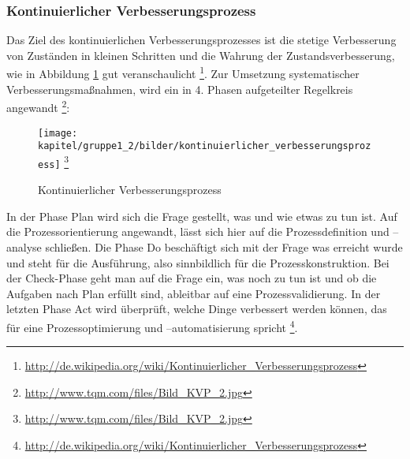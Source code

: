 \subsubsection{Kontinuierlicher Verbesserungsprozess}
\label{subsubsection_kontinuierlicher_verbesserungsprozess}
Das Ziel des kontinuierlichen Verbesserungsprozesses ist die stetige Verbesserung von Zuständen in kleinen Schritten und die Wahrung der  Zustandsverbesserung, wie in Abbildung \ref{fig_kontinuierliche_verbesserung} gut veranschaulicht \footnote{\url{http://de.wikipedia.org/wiki/Kontinuierlicher_Verbesserungsprozess}}. Zur Umsetzung systematischer Verbesserungsmaßnahmen, wird ein in 4. Phasen aufgeteilter Regelkreis angewandt \footnote{\url{http://www.tqm.com/files/Bild_KVP_2.jpg}}:
 
\begin{figure}[h!]
	\centering
	\texttt{[image: kapitel/gruppe1\_2/bilder/kontinuierlicher\_verbesserungsprozess]} \footnote{\url{http://www.tqm.com/files/Bild_KVP_2.jpg}}
	\caption{Kontinuierlicher Verbesserungsprozess}
	\label{fig_kontinuierliche_verbesserung}
\end{figure}


In der Phase Plan wird sich die Frage gestellt, was und wie etwas zu tun ist. Auf die Prozessorientierung angewandt, lässt sich hier auf die Prozessdefinition und –analyse schließen. Die Phase Do beschäftigt sich mit der Frage was erreicht wurde und steht für die Ausführung, also sinnbildlich für die Prozesskonstruktion. Bei der Check-Phase geht man auf die Frage ein, was noch zu tun ist und ob die Aufgaben nach Plan erfüllt sind, ableitbar auf eine Prozessvalidierung. In der letzten Phase Act wird überprüft, welche Dinge verbessert werden können, das für eine Prozessoptimierung und –automatisierung spricht \footnote{\url{http://de.wikipedia.org/wiki/Kontinuierlicher_Verbesserungsprozess}}.



